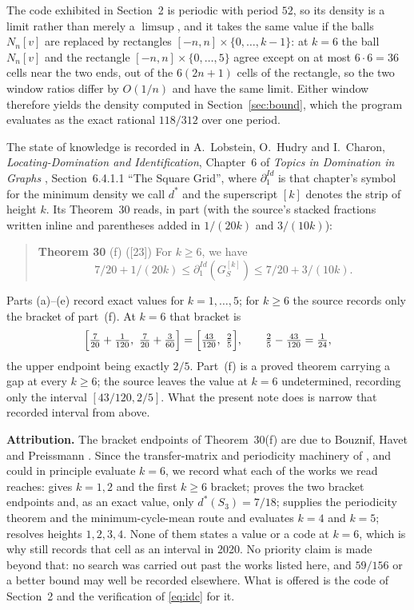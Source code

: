 \documentclass[11pt]{amsart}
\theoremstyle{remark}
\newcommand{\dstar}{d^{*}}
\begin{document}
The code exhibited in Section~2 is periodic with period $52$, so its density is a limit rather than
merely a $\limsup$, and it takes the same value if the balls $N_n[v]$ are replaced by rectangles
$[-n,n]\times\{0,\dots,k-1\}$: at $k=6$ the ball $N_n[v]$ and the rectangle
$[-n,n]\times\{0,\dots,5\}$ agree except on at most $6\cdot6=36$ cells near the two ends, out of
the $6(2n+1)$ cells of the rectangle, so the two window ratios differ by $O(1/n)$ and have the
same limit. Either window therefore yields the density computed in Section~\ref{sec:bound}, which
the program evaluates as the exact rational $118/312$ over one period.

The state of knowledge is recorded in A.~Lobstein, O.~Hudry and I.~Charon,
\emph{Locating-Domination and Identification}, Chapter~6 of \emph{Topics in Domination in
Graphs} \cite{LHC}, Section~6.4.1.1 ``The Square Grid'', where $\partial_1^{Id}$ is that
chapter's symbol for the minimum density we call $\dstar$ and the superscript $[k]$ denotes
the strip of height $k$. Its Theorem~30 reads, in part (with the source's stacked fractions
written inline and parentheses added in $1/(20k)$ and $3/(10k)$):

\begin{quote}
\textbf{Theorem 30}
(f) ([23]) For $k\ge6$, we have
\[
  7/20+1/(20k)\le \partial_1^{Id}(G_S^{[k]})\le 7/20+3/(10k).
\]
\end{quote}

Parts (a)--(e) record exact values for $k=1,\dots,5$; for $k\ge6$ the source records only the
bracket of part~(f). At $k=6$ that bracket is
\[
  \Bigl[\tfrac{7}{20}+\tfrac{1}{120},\ \tfrac{7}{20}+\tfrac{3}{60}\Bigr]
  = \Bigl[\tfrac{43}{120},\ \tfrac{2}{5}\Bigr],
  \qquad \tfrac{2}{5}-\tfrac{43}{120}=\tfrac{1}{24},
\]
the upper endpoint being exactly $2/5$. Part~(f) is a proved theorem carrying a gap at every
$k\ge6$; the source leaves the value at $k=6$ undetermined, recording only the interval
$[43/120,2/5]$. What the present note does is narrow that recorded interval from above.

\medskip
\noindent\textbf{Attribution.} The bracket endpoints of Theorem~30(f) are due to Bouznif,
Havet and Preissmann \cite{BHP}. Since the transfer-matrix and periodicity machinery of
\cite{Jiang}, \cite{BHP} and \cite{BDMP} could in principle evaluate $k=6$, we record what each
of the works we read reaches: \cite{DGM} gives $k=1,2$ and the first $k\ge6$ bracket; \cite{BHP}
proves the two bracket endpoints and, as an exact value, only $\dstar(S_3)=7/18$; \cite{Jiang}
supplies the periodicity theorem and the minimum-cycle-mean route and evaluates $k=4$ and $k=5$;
\cite{BDMP} resolves heights $1,2,3,4$. None of them states a value or a code at $k=6$, which is
why \cite{LHC} still records that cell as an interval in 2020. No priority claim is made beyond
that: no search was carried out past the works listed here, and $59/156$ or a better bound may
well be recorded elsewhere. What is offered is the code of Section~2 and the verification of
\eqref{eq:idc} for it.
\end{document}

